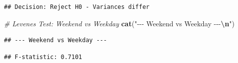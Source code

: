 \documentclass[
  12pt,
]{article}
\newenvironment{Shaded}{\begin{snugshade}}{\end{snugshade}}
\newcommand{\AttributeTok}[1]{\textcolor[rgb]{0.13,0.29,0.53}{#1}}
\newcommand{\CommentTok}[1]{\textcolor[rgb]{0.56,0.35,0.01}{\textit{#1}}}
\newcommand{\ConstantTok}[1]{\textcolor[rgb]{0.56,0.35,0.01}{#1}}
\newcommand{\DecValTok}[1]{\textcolor[rgb]{0.00,0.00,0.81}{#1}}
\newcommand{\FunctionTok}[1]{\textcolor[rgb]{0.13,0.29,0.53}{\textbf{#1}}}
\newcommand{\NormalTok}[1]{#1}
\newcommand{\OtherTok}[1]{\textcolor[rgb]{0.56,0.35,0.01}{#1}}
\newcommand{\SpecialCharTok}[1]{\textcolor[rgb]{0.81,0.36,0.00}{\textbf{#1}}}
\newcommand{\StringTok}[1]{\textcolor[rgb]{0.31,0.60,0.02}{#1}}
\begin{document}
\begin{verbatim}
## Decision: Reject H0 - Variances differ
\end{verbatim}

\begin{Shaded}
\begin{Highlighting}[]
\CommentTok{\# Levene\textquotesingle{}s Test: Weekend vs Weekday}
\FunctionTok{cat}\NormalTok{(}\StringTok{"{-}{-}{-} Weekend vs Weekday {-}{-}{-}}\SpecialCharTok{\textbackslash{}n}\StringTok{"}\NormalTok{)}
\end{Highlighting}
\end{Shaded}

\begin{verbatim}
## --- Weekend vs Weekday ---
\end{verbatim}

\begin{Shaded}
\end{Shaded}

\begin{verbatim}
## F-statistic: 0.7101
\end{verbatim}

\begin{Shaded}
\end{Shaded}
\end{document}
